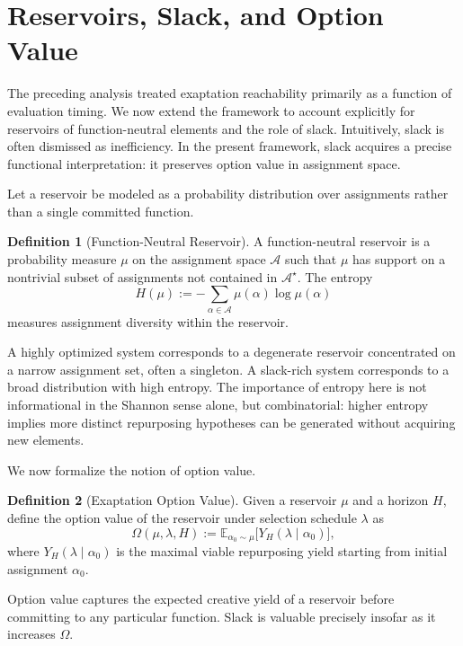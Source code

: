 \documentclass[11pt]{article}
\theoremstyle{definition}
\newtheorem{definition}{Definition}
\begin{document}
\section{Reservoirs, Slack, and Option Value}

The preceding analysis treated exaptation reachability primarily as a function of evaluation timing. We now extend the framework to account explicitly for reservoirs of function-neutral elements and the role of slack. Intuitively, slack is often dismissed as inefficiency. In the present framework, slack acquires a precise functional interpretation: it preserves option value in assignment space.

Let a reservoir be modeled as a probability distribution over assignments rather than a single committed function.

\begin{definition}[Function-Neutral Reservoir]
A function-neutral reservoir is a probability measure $\mu$ on the assignment space $\mathcal{A}$ such that $\mu$ has support on a nontrivial subset of assignments not contained in $\mathcal{A}^\star$. The entropy
\[
H(\mu) := -\sum_{\alpha\in\mathcal{A}} \mu(\alpha)\log \mu(\alpha)
\]
measures assignment diversity within the reservoir.
\end{definition}

A highly optimized system corresponds to a degenerate reservoir concentrated on a narrow assignment set, often a singleton. A slack-rich system corresponds to a broad distribution with high entropy. The importance of entropy here is not informational in the Shannon sense alone, but combinatorial: higher entropy implies more distinct repurposing hypotheses can be generated without acquiring new elements.

We now formalize the notion of option value.

\begin{definition}[Exaptation Option Value]
Given a reservoir $\mu$ and a horizon $H$, define the option value of the reservoir under selection schedule $\lambda$ as
\[
\Omega(\mu,\lambda,H) := \mathbb{E}_{\alpha_0\sim\mu}\big[ Y_H(\lambda \mid \alpha_0)\big],
\]
where $Y_H(\lambda \mid \alpha_0)$ is the maximal viable repurposing yield starting from initial assignment $\alpha_0$.
\end{definition}

Option value captures the expected creative yield of a reservoir before committing to any particular function. Slack is valuable precisely insofar as it increases $\Omega$.
\end{document}
